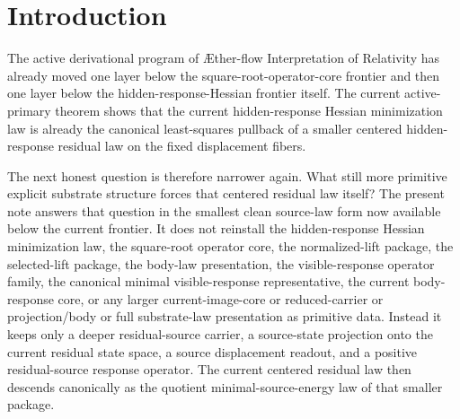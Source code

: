 \documentclass[11pt]{article}
\newcommand{\Aflow}{\AE{}ther-flow}
\newcommand{\TheoryName}{\Aflow{} Interpretation of Relativity}
\newcommand{\CompletedMetric}{g^{\sharp}}
\begin{document}
\begin{abstract}
The benchmark boundary remains unchanged throughout. The one operative metric is still exactly \(\CompletedMetric\), the ordinary matter route is unchanged, there is no second operative metric, the low-energy matter law is not enlarged, and no stronger promotion language is licensed. Once this smaller residual-source law is fixed, the same centered residual law, the same hidden-response Hessian minimization law, the same square-root operator core, the same section-centered displacement-body quadratic forcing law, the same visible-response operator family, the same canonical minimal visible-response representative, the same current body-response core, and every currently recorded downstream benchmark-facing consequence follow unchanged. The remaining honest burden therefore moves below the separate centered residual law itself to a deeper derivation or justification of the centered hidden-response residual-source law that forces it.
\end{abstract}

\section{Introduction}

The active derivational program of \TheoryName{} has already moved one layer below the square-root-operator-core frontier and then one layer below the hidden-response-Hessian frontier itself. The current active-primary theorem shows that the current hidden-response Hessian minimization law is already the canonical least-squares pullback of a smaller centered hidden-response residual law on the fixed displacement fibers.

The next honest question is therefore narrower again. What still more primitive explicit substrate structure forces that centered residual law itself? The present note answers that question in the smallest clean source-law form now available below the current frontier. It does not reinstall the hidden-response Hessian minimization law, the square-root operator core, the normalized-lift package, the selected-lift package, the body-law presentation, the visible-response operator family, the canonical minimal visible-response representative, the current body-response core, or any larger current-image-core or reduced-carrier or projection/body or full substrate-law presentation as primitive data. Instead it keeps only a deeper residual-source carrier, a source-state projection onto the current residual state space, a source displacement readout, and a positive residual-source response operator. The current centered residual law then descends canonically as the quotient minimal-source-energy law of that smaller package.
\end{document}

